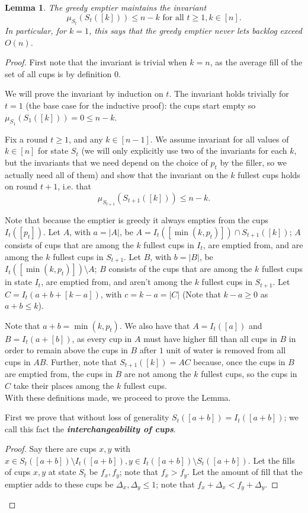 \documentclass[twocolumn]{article}[10pt]
\newcommand{\defn}[1]{{\textit{\textbf{\boldmath #1}}}\xspace}
\newtheorem{lemma}{Lemma}
\begin{document}
\begin{lemma}
  The greedy emptier maintains the invariant $$\mu_{S_t}(S_t([k])) \le n-k
  \text{ for all } t\ge 1, k \in [n].$$ In particular, for $k=1$, this
  says that the greedy emptier never lets backlog exceed $O(n)$.
\end{lemma}
\begin{proof}
First note that the invariant is trivial when $k=n$, as the average fill of the
set of all cups is by definition $0$.

We will prove the invariant by induction on $t$.
The invariant holds trivially for $t=1$ (the base case for the inductive proof): 
the cups start empty so $\mu_{S_1}(S_1([k])) = 0 \le n-k$.

Fix a round $t \ge 1$, and any $k \in [n-1]$. We assume invariant for all
values of $k\in[n]$ for state $S_t$ (we will only explicitly use two of the
invariants for each $k$, but the invariants that we need depend on the
choice of $p_t$ by the filler, so we actually need all of them) and show that
the invariant on the $k$ fullest cups holds on round $t+1$, i.e. that
$$\mu_{S_{t+1}}(S_{t+1}([k])) \le n-k.$$

Note that because the emptier is greedy it always empties from the cups $I_t([p_t])$.
Let $A$, with $a=|A|$, be $A = I_t([\min(k, p_t)]) \cap S_{t+1}([k])$; $A$
consists of cups that are among the $k$ fullest cups in $I_t$, are emptied from, and
are among the $k$ fullest cups in $S_{t+1}$.
Let $B$, with $b=|B|$, be $I_t([\min(k, p_t)]) \setminus A$; $B$ consists of
the cups that are among the $k$ fullest cups in state $I_t$, are emptied from, and aren't among the $k$ fullest cups in $S_{t+1}$. 
Let $C = I_t(a+b+[k-a])$, with $c=k-a = |C|$ (Note that $k-a\ge 0$ as $a+b \le k$). 

Note that $a+ b = \min(k, p_t)$. We also have that $A = I_t([a])$ and $B =
I_t(a+[b])$, as every cup in $A$ must have higher fill than all cups in $B$ in
order to remain above the cups in $B$ after $1$ unit of water is removed from
all cups in $AB$.
Further, note that $S_{t+1}([k]) = AC$ because, once the cups in $B$
are emptied from, the cups in $B$ are not among the $k$ fullest cups, so the
cups in $C$ take their places among the $k$ fullest cups.\\
With these definitions made, we proceed to prove the Lemma.

First we prove that without loss of generality $S_t([a+b]) = I_t([a+b])$; we
call this fact the \defn{interchangeability of cups}.
\begin{proof}
  Say there are cups $x, y$ with $x\in S_t([a+b]) \setminus I_t([a+b]), y \in
  I_t([a+b])\setminus S_t([a+b])$. Let the fills of cups $x,y$ at state $S_t$
  be $f_x, f_y$; note that $f_x > f_y$. Let the amount of fill that the emptier
  adds to these cups be $\Delta_x, \Delta_y \le 1$; note that $f_x +\Delta_x <
  f_y + \Delta_y$.


\end{proof}
\end{proof}
\end{document}
